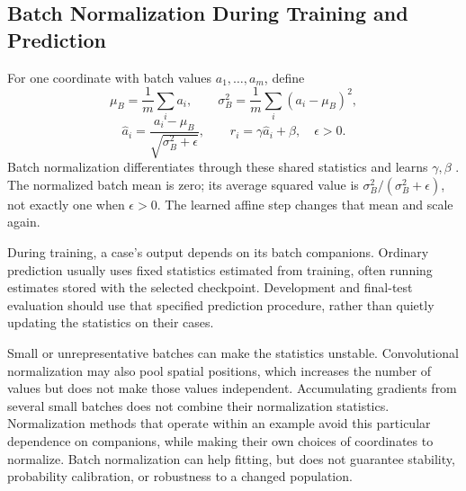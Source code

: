 \subsection{Batch Normalization During Training and Prediction}

For one coordinate with batch values $a_1,\ldots,a_m$, define
\[
\mu_B=\frac1m\sum_i a_i,
\qquad \sigma_B^2=\frac1m\sum_i(a_i-\mu_B)^2,
\]
\[
\hat a_i=\frac{a_i-\mu_B}{\sqrt{\sigma_B^2+\epsilon}},
\qquad r_i=\gamma\hat a_i+\beta,
\quad\epsilon>0.
\]
Batch normalization differentiates through these shared statistics and learns $\gamma,\beta$ \citep{ioffe2015batchnorm}. The normalized batch mean is zero; its average squared value is $\sigma_B^2/(\sigma_B^2+\epsilon)$, not exactly one when $\epsilon>0$. The learned affine step changes that mean and scale again.

\par\addvspace{\intextsep}\noindent\begin{minipage}{\linewidth}
\centering
{}
\label{fig:batch-norm-stability}
\end{minipage}\par\addvspace{\intextsep}

During training, a case's output depends on its batch companions. Ordinary prediction usually uses fixed statistics estimated from training, often running estimates stored with the selected checkpoint. Development and final-test evaluation should use that specified prediction procedure, rather than quietly updating the statistics on their cases.

Small or unrepresentative batches can make the statistics unstable. Convolutional normalization may also pool spatial positions, which increases the number of values but does not make those values independent. Accumulating gradients from several small batches does not combine their normalization statistics. Normalization methods that operate within an example avoid this particular dependence on companions, while making their own choices of coordinates to normalize. Batch normalization can help fitting, but does not guarantee stability, probability calibration, or robustness to a changed population.

